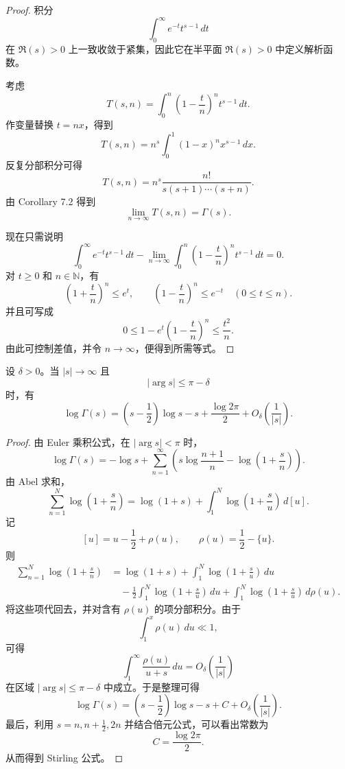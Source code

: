 \begin{proof}
	积分
	\[
		\int_0^\infty e^{-t}t^{s-1}\,dt
	\]
	在 $\Re(s)>0$ 上一致收敛于紧集，因此它在半平面 $\Re(s)>0$ 中定义解析函数。

	考虑
	\[
		T(s,n)=\int_0^n\left(1-\frac{t}{n}\right)^n t^{s-1}\,dt.
	\]
	作变量替换 $t=nx$，得到
	\[
		T(s,n)
		=
		n^s\int_0^1(1-x)^n x^{s-1}\,dx.
	\]
	反复分部积分可得
	\[
		T(s,n)
		=
		n^s\frac{n!}{s(s+1)\cdots(s+n)}.
	\]
	由 Corollary 7.2 得到
	\[
		\lim_{n\to\infty}T(s,n)=\Gamma(s).
	\]

	现在只需说明
	\[
		\int_0^\infty e^{-t}t^{s-1}\,dt
		-
		\lim_{n\to\infty}\int_0^n\left(1-\frac{t}{n}\right)^n t^{s-1}\,dt
		=0.
	\]
	对 $t\geq0$ 和 $n\in\mathbb N$，有
	\[
		\left(1+\frac{t}{n}\right)^n\leq e^t,
		\qquad
		\left(1-\frac{t}{n}\right)^n\leq e^{-t}
		\quad(0\leq t\leq n).
	\]
	并且可写成
	\[
		0\leq 1-e^t\left(1-\frac{t}{n}\right)^n\leq \frac{t^2}{n}.
	\]
	由此可控制差值，并令 $n\to\infty$，便得到所需等式。
\end{proof}

\begin{theorem}
	设 $\delta>0$。当 $|s|\to\infty$ 且
	\[
		|\arg s|\leq \pi-\delta
	\]
	时，有
	\[
		\log\Gamma(s)
		=
		\left(s-\frac12\right)\log s
		-s+\frac{\log 2\pi}{2}
		+O_\delta\left(\frac{1}{|s|}\right).
	\]
\end{theorem}

\begin{proof}
	由 Euler 乘积公式，在 $|\arg s|<\pi$ 时，
	\[
		\log\Gamma(s)
		=
		-\log s+
		\sum_{n=1}^\infty
		\left(
			s\log\frac{n+1}{n}
			-\log\left(1+\frac{s}{n}\right)
		\right).
	\]
	由 Abel 求和，
	\[
		\sum_{n=1}^{N}\log\left(1+\frac{s}{n}\right)
		=
		\log(1+s)
		+
		\int_1^N\log\left(1+\frac{s}{u}\right)\,d[u].
	\]
	记
	\[
		[u]=u-\frac12+\rho(u),
		\qquad
		\rho(u)=\frac12-\{u\}.
	\]
	则
	\[
	\begin{aligned}
		\sum_{n=1}^{N}\log\left(1+\frac{s}{n}\right)
		&=
		\log(1+s)
		+
		\int_1^N\log\left(1+\frac{s}{u}\right)\,du  \\
		&\quad
		-\frac12\int_1^N\log\left(1+\frac{s}{u}\right)\,du
		+
		\int_1^N\log\left(1+\frac{s}{u}\right)\,d\rho(u).
	\end{aligned}
	\]
	将这些项代回去，并对含有 $\rho(u)$ 的项分部积分。由于
	\[
		\int_1^x \rho(u)\,du\ll1,
	\]
	可得
	\[
		\int_1^\infty \frac{\rho(u)}{u+s}\,du
		=
		O_\delta\left(\frac1{|s|}\right)
	\]
	在区域 $|\arg s|\leq \pi-\delta$ 中成立。于是整理可得
	\[
		\log\Gamma(s)
		=
		\left(s-\frac12\right)\log s
		-s+C
		+O_\delta\left(\frac1{|s|}\right).
	\]
	最后，利用 $s=n,n+\frac12,2n$ 并结合倍元公式，可以看出常数为
	\[
		C=\frac{\log 2\pi}{2}.
	\]
	从而得到 Stirling 公式。
\end{proof}

